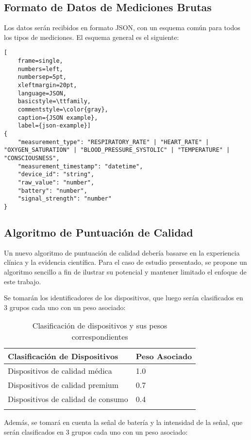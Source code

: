 \subsection{Formato de Datos de Mediciones Brutas}

Los datos serán recibidos en formato JSON, con un esquema común para todos los tipos de mediciones.
El esquema general es el siguiente:
\begin{lstlisting}[
    frame=single,
    numbers=left,
    numbersep=5pt,
    xleftmargin=20pt,
    language=JSON,
    basicstyle=\ttfamily,
    commentstyle=\color{gray},
    caption={JSON example},
    label={json-example}]
{
    "measurement_type": "RESPIRATORY_RATE" | "HEART_RATE" | "OXYGEN_SATURATION" | "BLOOD_PRESSURE_SYSTOLIC" | "TEMPERATURE" | "CONSCIOUSNESS",
    "measurement_timestamp": "datetime",
    "device_id": "string",
    "raw_value": "number",
    "battery": "number",
    "signal_strength": "number"
}
\end{lstlisting}
\newpage

\subsection{Algoritmo de Puntuación de Calidad}
Un nuevo algoritmo de puntuación de calidad debería basarse en la experiencia clínica y la evidencia científica. Para el caso de estudio presentado, 
se propone un algoritmo sencillo a fin de ilustrar su potencial y mantener limitado el enfoque de este trabajo.

Se tomarán los identificadores de los dispositivos, que luego serán clasificados en 3 grupos cada uno con un peso asociado: 

\begin{longtable}{|p{6cm}|p{3cm}|}
    \hline
    \textbf{Clasificación de Dispositivos} & \textbf{Peso Asociado} \\
    \hline
    \endhead
    Dispositivos de calidad médica & 1.0 \\
    \hline
    Dispositivos de calidad premium & 0.7 \\
    \hline
    Dispositivos de calidad de consumo & 0.4 \\
    \hline
    \caption{Clasificación de dispositivos y sus pesos correspondientes}
    \label{tab:dispositivos}
\end{longtable}
    

Además, se tomará en cuenta la señal de batería y la intensidad de la señal, que serán clasificados en 3 grupos cada uno con un peso asociado:

